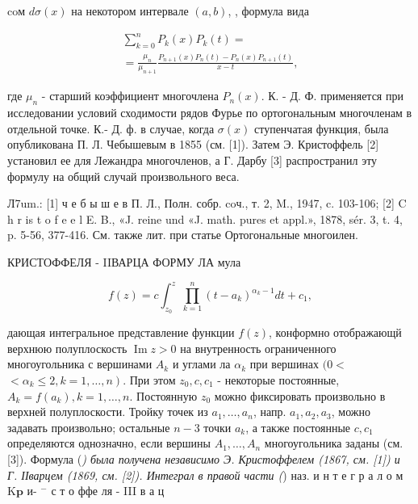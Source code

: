 \documentclass[10pt]{article}
\begin{document}
coм $d \sigma(x)$ на некотором интервале $(a, b)$, , формула вида



\[

\begin{gathered}

\sum_{k=0}^{n} P_{k}(x) P_{k}(t)= \\

=\frac{\mu_{n}}{\mu_{n+1}} \frac{P_{n+1}(x) P_{n}(t)-P_{n}(x) P_{n+1}(t)}{x-t},

\end{gathered}

\]



где $\mu_{n}$ - старший коэффициент многочлена $P_{n}(x)$. К. - Д. Ф. применяется при исследовании условий сходимости рядов Фурье по ортогональным многочленам в отдельной точке. К.- Д. ф. в случае, когда $\sigma(x)$ ступенчатая функция, была опубликована П. Л. Чебышевым в 1855 (см. [1]). Затем Э. Кристоффель [2] установил ее для Лежандра многочленов, а Г. Дарбу [3] распространил эту формулу на общий случай произвольного веса.



Л7um.: [1] ч е б ы ш е в П. Л., Полн. собр. coч., т. 2, M., 1947, c. 103-106; [2] C h r is t o f e e l E. B., «J. reine und «J. math. pures et appl.», 1878, sér. 3, t. 4, p. 5-56, 377-416. См. также лит. при статье Ортогональные многоилен.



КРИСТОФФЕЛЯ - IIВАРЦА ФОРМУ ЛА мула



\[

f(z)=c \int_{z_{0}}^{z} \prod_{k=1}^{n}\left(t-a_{k}\right)^{\alpha_{k}-1} d t+c_{1},

\]



дающая интегральное представление функции $f(z)$, конформно отображающй верхнюю полуплоскость $\operatorname{Im} z>0$ на внутренность ограниченного многоугольника с вершинами $A_{k}$ и углами ла $\alpha_{k}$ при вершинах $(0<$ $\left.<\alpha_{k} \leqslant 2, k=1, \ldots, n\right)$. При этом $z_{0}, c, c_{1}$ - некоторые постоянные, $A_{k}=f\left(a_{k}\right), k=1, \ldots, n$. Постоянную $z_{0}$ можно фиксировать произвольно в верхней полуплоскости. Тройку точек из $a_{1}, \ldots, a_{n}$, напр. $a_{1}, a_{2}, a_{3}$, можно задавать произвольно; остальные $n-3$ точки $a_{k}$, а также постоянные $c, c_{1}$ определяются однозначно, если вершины $A_{1}, \ldots, A_{n}$ многоугольника заданы (см. [3]). Формула (\textit{) была получена независимо Э. Кристоффелем (1867, см. [1]) и Г. ІІварцем (1869, см. [2]). Интеграл в правой части (}) наз. и н т е г р а л о м $\mathrm{K} \mathbf{p}$ и- $^{-}$ с т о ффе ля - III в а ц
\end{document}
